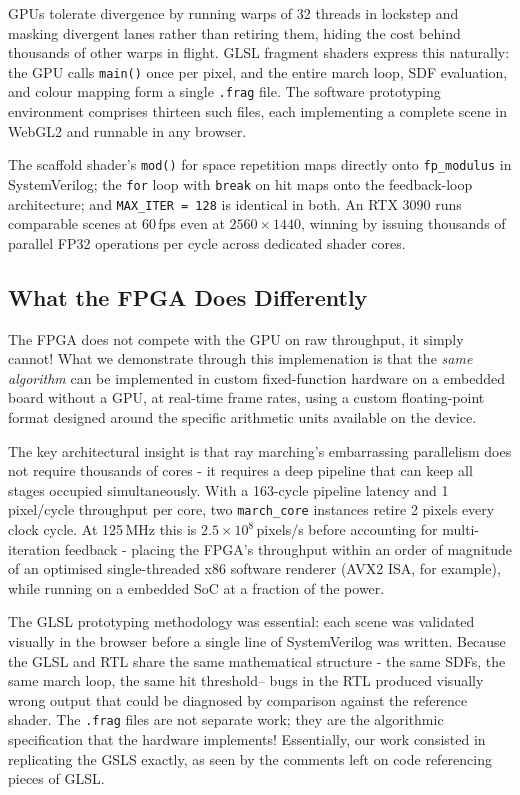 GPUs tolerate divergence by running warps of 32 threads in lockstep and masking
divergent lanes rather than retiring them, hiding the cost behind thousands of
other warps in flight. GLSL fragment shaders express this naturally: the GPU
calls \texttt{main()} once per pixel, and the entire march loop, SDF evaluation,
and colour mapping form a single \texttt{.frag} file. The software prototyping
environment comprises thirteen such files, each implementing a complete scene in
WebGL2 and runnable in any browser.

The scaffold shader's \texttt{mod()} for space repetition maps directly onto
\texttt{fp\_modulus} in SystemVerilog; the \texttt{for} loop with
\texttt{break} on hit maps onto the feedback-loop architecture; and
\texttt{MAX\_ITER\,=\,128} is identical in both. An RTX 3090 runs comparable
scenes at 60\,fps even at $2560\times1440$, winning by issuing thousands of
parallel FP32 operations per cycle across dedicated shader cores.

\subsection{What the FPGA Does Differently}

The FPGA does not compete with the GPU on raw throughput, it simply cannot! What
we demonstrate through this implemenation is that the \textit{same algorithm} can be implemented in
custom fixed-function hardware on a  embedded board without a GPU, at
real-time frame rates, using a custom floating-point format designed around
the specific arithmetic units available on the device.

The key architectural insight is that ray marching's embarrassing parallelism
does not require thousands of cores - it requires a deep pipeline that can
keep all stages occupied simultaneously. With a 163-cycle pipeline latency
and 1 pixel/cycle throughput per core, two \texttt{march\_core} instances
retire 2 pixels every clock cycle. At 125\,MHz this is
$2.5\times10^8$\,pixels/s before accounting for multi-iteration feedback -
placing the FPGA's throughput within an order of magnitude of an optimised
single-threaded x86 software renderer (AVX2 ISA, for example), while running on a  embedded SoC
at a fraction of the power.

The GLSL prototyping methodology was essential: each scene was validated
visually in the browser before a single line of SystemVerilog was written.
Because the GLSL and RTL share the same mathematical structure - the same
SDFs, the same march loop, the same hit threshold-- bugs in the RTL
produced visually wrong output that could be diagnosed by comparison against
the reference shader. The \texttt{.frag} files are not separate work; they
are the algorithmic specification that the hardware implements! Essentially, our work consisted in replicating the GSLS exactly, as seen by the comments left on code referencing pieces of GLSL.

